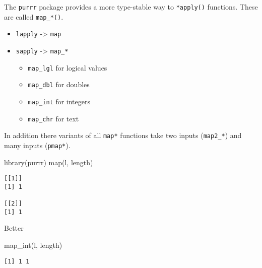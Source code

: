 \documentclass[ignorenonframetext,,t]{beamer}
\providecommand{\tightlist}{%
\setlength{\itemsep}{0pt}\setlength{\parskip}{0pt}}
\newenvironment{Shaded}{\begin{snugshade}}{\end{snugshade}}
\newcommand{\FunctionTok}[1]{\textcolor[rgb]{0.00,0.00,0.00}{#1}}
\newcommand{\NormalTok}[1]{#1}
\providecommand{\tightlist}{%
\setlength{\itemsep}{0pt}\setlength{\parskip}{0pt}}
\renewcommand{\tightlist}{\setlength{\itemsep}{1.4ex}\setlength{\parskip}{0pt}}
\begin{document}
\begin{frame}[fragile]
The \texttt{purrr} package provides a more type-stable way to
\texttt{*apply()} functions. These are called \texttt{map\_*()}.

\begin{itemize}
\tightlist
\item
  \texttt{lapply} -\textgreater{} \texttt{map}
\item
  \texttt{sapply} -\textgreater{} \texttt{map\_*}

  \begin{itemize}
  \tightlist
  \item
    \texttt{map\_lgl} for logical values
  \item
    \texttt{map\_dbl} for doubles
  \item
    \texttt{map\_int} for integers
  \item
    \texttt{map\_chr} for text
  \end{itemize}
\end{itemize}

In addition there variants of all \texttt{map*} functions take two
inputs (\texttt{map2\_*}) and many inputs (\texttt{pmap*}).
\end{frame}

\begin{frame}[fragile]
\begin{Shaded}
\begin{Highlighting}[]
\FunctionTok{library}\NormalTok{(purrr)}
\FunctionTok{map}\NormalTok{(l, length)}
\end{Highlighting}
\end{Shaded}

\begin{verbatim}
[[1]]
[1] 1

[[2]]
[1] 1
\end{verbatim}

Better

\begin{Shaded}
\begin{Highlighting}[]
\FunctionTok{map\_int}\NormalTok{(l, length)}
\end{Highlighting}
\end{Shaded}

\begin{verbatim}
[1] 1 1
\end{verbatim}
\end{frame}
\end{document}

